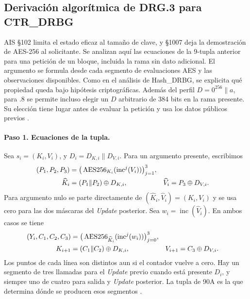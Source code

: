 \documentclass[11pt,a4paper]{article}
\newcommand{\AES}{\operatorname{AES256}}
\begin{document}
\subsection{Derivación algorítmica de DRG.3 para CTR\_DRBG}
\label{sec:ctr-drgg-derive}

AIS §102 limita el estado eficaz al tamaño de clave, y §1007
deja la demostración de AES-256 al solicitante. Se analizan
aquí las ecuaciones de la 9-tupla anterior para una petición
de un bloque, incluida la rama sin dato adicional. El
argumento se formula desde cada segmento de evaluaciones AES
y las observaciones disponibles. Como en el análisis de
Hash\_DRBG, se explicita qué propiedad queda bajo hipótesis
criptográficas. Además del perfil \(D=0^{256}\|a\), para .8
se permite incluso elegir un \(D\) arbitrario de 384 bits
en la rama presente. Su elección tiene lugar antes de
evaluar la petición y usa los datos públicos previos
\cite[§§102, 207, 211--214, 380, 1007 y 1033--1075]{ais}.

\paragraph{Paso 1. Ecuaciones de la tupla.}
Sea \(s_i=(K_i,V_i)\), y \(D_i=D_{K,i}\|D_{V,i}\).
Para un argumento presente, escribimos
\begin{align}
 (P_1,P_2,P_3)
  &=\big(\AES_{K_i}(\operatorname{inc}^{j}(V_i))\big)_{j=1}^{3},
       \label{eq:ctr-pre}\\
 \widehat K_i&=(P_1\|P_2)\oplus D_{K,i},&
 \widehat V_i&=P_3\oplus D_{V,i}. \notag
\end{align}
Para argumento nulo se parte directamente de
\((\widehat K_i,\widehat V_i)=(K_i,V_i)\) y se usa cero
para las dos máscaras del \emph{Update} posterior. Sea
\(w_i=\operatorname{inc}(\widehat V_i)\). En ambos casos se tiene
\begin{align}
 (Y_i,C_1,C_2,C_3)
   &=\big(\AES_{\widehat K_i}(\operatorname{inc}^{j}(w_i))\big)_{j=0}^{3},
       \label{eq:ctr-post}\\
 K_{i+1}&=(C_1\|C_2)\oplus D_{K,i},&
 V_{i+1}&=C_3\oplus D_{V,i}. \notag
\end{align}
Los puntos de cada línea son distintos aun si el contador vuelve
a cero. Hay un segmento de tres llamadas para el \emph{Update}
previo cuando está presente \(D_i\), y siempre uno de cuatro
para salida y \emph{Update} posterior. La tupla de 90A es la que
determina dónde se producen esos segmentos
\cite[§§10.2.1.2 y 10.2.1.5.1]{nist90a}.
\end{document}
